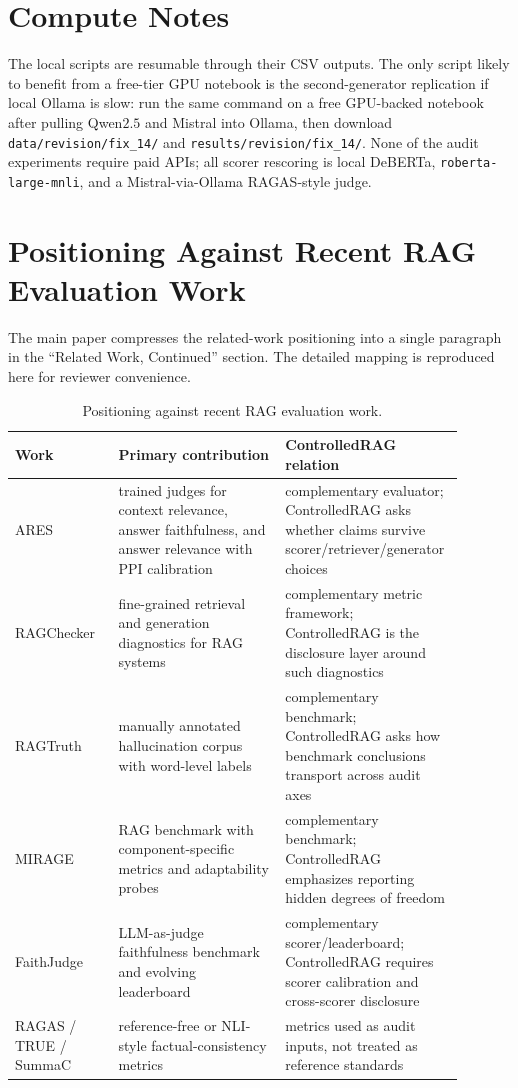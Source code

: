 \section{Compute Notes}
\label{app:compute_notes}

The local scripts are resumable through their CSV outputs. The only
script likely to benefit from a free-tier GPU notebook is the
second-generator replication if local Ollama is slow: run the same
command on a free GPU-backed notebook after pulling Qwen$2.5$ and
Mistral into Ollama, then download \texttt{data/revision/fix\_14/} and
\texttt{results/revision/fix\_14/}. None of the audit experiments
require paid APIs; all scorer rescoring is local DeBERTa,
\texttt{roberta-large-mnli}, and a Mistral-via-Ollama RAGAS-style
judge.

\section{Positioning Against Recent RAG Evaluation Work}
\label{app:related_positioning}

The main paper compresses the related-work positioning into a single
paragraph in the ``Related Work, Continued'' section. The detailed
mapping is reproduced here for reviewer convenience.

\begin{table}[!htb]
\centering
\caption{Positioning against recent RAG evaluation work.}
\label{tab:supp:related_positioning}
\scriptsize
\begin{tabular}{p{0.17\linewidth}p{0.36\linewidth}p{0.36\linewidth}}
\toprule
Work & Primary contribution & ControlledRAG relation \\
\midrule
ARES~\citep{saadfalcon2024ares} & trained judges for context relevance, answer faithfulness, and answer relevance with PPI calibration & complementary evaluator; ControlledRAG asks whether claims survive scorer/retriever/generator choices \\
RAGChecker~\citep{ru2024ragchecker} & fine-grained retrieval and generation diagnostics for RAG systems & complementary metric framework; ControlledRAG is the disclosure layer around such diagnostics \\
RAGTruth~\citep{niu2024ragtruth} & manually annotated hallucination corpus with word-level labels & complementary benchmark; ControlledRAG asks how benchmark conclusions transport across audit axes \\
MIRAGE~\citep{park2025mirage} & RAG benchmark with component-specific metrics and adaptability probes & complementary benchmark; ControlledRAG emphasizes reporting hidden degrees of freedom \\
FaithJudge~\citep{tamber2025faithjudge} & LLM-as-judge faithfulness benchmark and evolving leaderboard & complementary scorer/leaderboard; ControlledRAG requires scorer calibration and cross-scorer disclosure \\
RAGAS / TRUE / SummaC~\citep{es2024ragas,honovich2022true,laban2022summac} & reference-free or NLI-style factual-consistency metrics & metrics used as audit inputs, not treated as reference standards \\
\bottomrule
\end{tabular}
\end{table}
